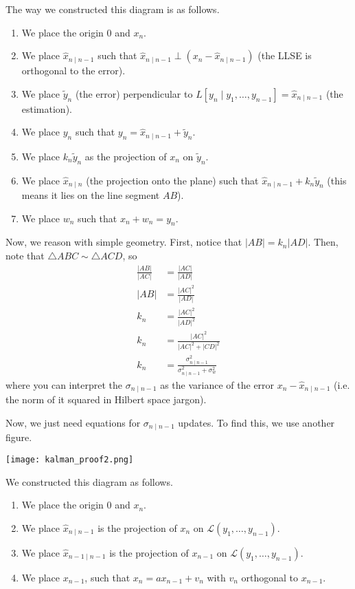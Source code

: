 \begin{theorem}
\begin{proof*}
        The way we constructed this diagram is as follows.
        \begin{enumerate}
            \item We place the origin 0 and $x_n$. 
            \item We place $\hat{x}_{n \mid n - 1}$ such that $\hat{x}_{n \mid n - 1} \perp (x_n - \hat{x}_{n \mid n - 1})$ (the LLSE is orthogonal to the error).
            \item We place $\tilde{y}_n$ (the error) perpendicular to $L[y_n \mid y_1, \dots, y_{n - 1}] = \hat{x}_{n \mid n - 1}$ (the estimation).
            \item We place $y_n$ such that $y_n = \hat{x}_{n \mid n - 1} + \tilde{y}_n$.
            \item We place $k_n \tilde{y}_n$ as the projection of $x_n$ on $\tilde{y}_n$.
            \item We place $\hat{x}_{n \mid n}$ (the projection onto the plane) such that $\hat{x}_{n \mid n - 1} + k_n \tilde{y}_n$ (this means it lies on the line segment $AB$).
            \item We place $w_n$ such that $x_n + w_n = y_n$.
        \end{enumerate}

        Now, we reason with simple geometry. First, notice that $|AB| = k_n |AD|$. Then, note that $\triangle ABC \sim \triangle ACD$, so
        \begin{align*}
            \frac{|AB|}{|AC|} &= \frac{|AC|}{|AD|} \\
            |AB| &= \frac{|AC|^2}{|AD|} \\
            k_n &= \frac{|AC|^2}{|AD|^2} \\
            k_n &= \frac{|AC|^2}{|AC|^2 + |CD|^2} \\
            k_n &= \frac{\sigma_{n \mid n - 1}^2}{\sigma_{n \mid n - 1}^2 + \sigma_w^2}
        \end{align*}
        where you can interpret the $\sigma_{n \mid n - 1}$ as the variance of the error $x_n - \hat{x}_{n \mid n - 1}$ (i.e. the norm of it squared in Hilbert space jargon).

        Now, we just need equations for $\sigma_{n \mid n - 1}$ updates. To find this, we use another figure.

        \texttt{[image: kalman\_proof2.png]}

        We constructed this diagram as follows.
        \begin{enumerate}
            \item We place the origin 0 and $x_n$.
            \item We place $\hat{x}_{n \mid n - 1}$ is the projection of $x_n$ on $\mathcal{L}(y_1, \dots, y_{n - 1})$.
            \item We place $\hat{x}_{n - 1 \mid n - 1}$ is the projection of $x_{n - 1}$ on $\mathcal{L}(y_1, \dots, y_{n - 1})$.
            \item We place $x_{n - 1}$, such that $x_n = ax_{n - 1} + v_n$ with $v_n$ orthogonal to $x_{n - 1}$.
        \end{enumerate}


\end{proof*}
\end{theorem}
